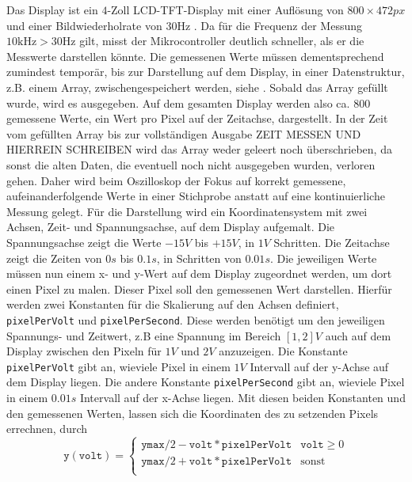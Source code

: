 Das Display ist ein $4$-Zoll LCD-TFT-Display mit einer Auflösung von \newline $800 \times 472 \si{px}$
und einer Bildwiederholrate von 30\si{\hertz} \cite{MikroControllerDatasheet_1}.
Da für die Frequenz der Messung $10 \si{\kilo\hertz} > 30 \si{\hertz}$ gilt,
misst der Mikrocontroller deutlich schneller, als er die Messwerte darstellen könnte.
Die gemessenen Werte müssen dementsprechend zumindest temporär, bis zur Darstellung auf dem Display,
in einer Datenstruktur, z.B. einem Array, zwischengespeichert werden, siehe \cite{Oscilloscope_Code}.
Sobald das Array gefüllt wurde, wird es ausgegeben.
Auf dem gesamten Display werden also ca. 800 gemessene Werte, ein Wert pro Pixel auf der Zeitachse,
dargestellt. \newline
In der Zeit vom gefüllten Array bis zur
vollständigen Ausgabe ZEIT MESSEN UND HIERREIN SCHREIBEN wird das Array weder geleert noch überschrieben,
da sonst die alten Daten, die eventuell noch nicht ausgegeben wurden, verloren gehen.
Daher wird beim Oszilloskop der Fokus auf korrekt gemessene, aufeinanderfolgende Werte in einer
Stichprobe anstatt auf eine kontinuierliche Messung gelegt.
\newline \newline
Für die Darstellung wird ein Koordinatensystem mit zwei Achsen, Zeit- und Spannungsachse,
auf dem Display aufgemalt.
Die Spannungsachse zeigt die Werte $-15V$ bis $+15V$, in $1V$ Schritten.
Die Zeitachse zeigt die Zeiten von $0s$ bis $0.1s$, in Schritten von $0.01s$.
Die jeweiligen Werte müssen nun einem x- und y-Wert auf dem Display zugeordnet werden,
um dort einen Pixel zu malen. Dieser Pixel soll den gemessenen Wert darstellen. \newline
Hierfür werden zwei Konstanten für die Skalierung auf den Achsen definiert,
\texttt{pixelPerVolt} und \texttt{pixelPerSecond}.
Diese werden benötigt um den jeweiligen Spannungs- und Zeitwert, z.B eine Spannung im Bereich
$[1,2]V$ auch auf dem Display zwischen den Pixeln für $1V$ und $2V$ anzuzeigen.
Die Konstante \texttt{pixelPerVolt} gibt an, wieviele Pixel in einem $1V$ Intervall auf der
y-Achse auf dem Display liegen.
Die andere Konstante \texttt{pixelPerSecond} gibt an, wieviele Pixel in einem $0.01s$ Intervall
auf der x-Achse liegen. \newline
Mit diesen beiden Konstanten und den gemessenen Werten, lassen sich die Koordinaten des zu setzenden
Pixels errechnen, durch
$$
\texttt{y}(\texttt{volt}) = \begin{cases}
	\texttt{ymax}/2 - \texttt{volt} * \texttt{pixelPerVolt} & \texttt{volt} \ge 0 \\
	\texttt{ymax}/2 + \texttt{volt} * \texttt{pixelPerVolt} & \text{sonst} \\
\end{cases}
$$
